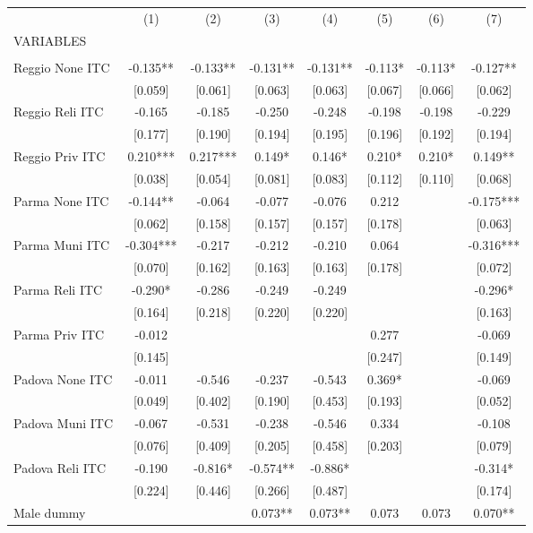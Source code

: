 \begin{tabular}{lccccccc} \hline
 & (1) & (2) & (3) & (4) & (5) & (6) & (7) \\
VARIABLES &  &  &  &  &  &  &  \\ \hline
 &  &  &  &  &  &  &  \\
Reggio None ITC & -0.135** & -0.133** & -0.131** & -0.131** & -0.113* & -0.113* & -0.127** \\
 & [0.059] & [0.061] & [0.063] & [0.063] & [0.067] & [0.066] & [0.062] \\
Reggio Reli ITC & -0.165 & -0.185 & -0.250 & -0.248 & -0.198 & -0.198 & -0.229 \\
 & [0.177] & [0.190] & [0.194] & [0.195] & [0.196] & [0.192] & [0.194] \\
Reggio Priv ITC & 0.210*** & 0.217*** & 0.149* & 0.146* & 0.210* & 0.210* & 0.149** \\
 & [0.038] & [0.054] & [0.081] & [0.083] & [0.112] & [0.110] & [0.068] \\
Parma None ITC & -0.144** & -0.064 & -0.077 & -0.076 & 0.212 &  & -0.175*** \\
 & [0.062] & [0.158] & [0.157] & [0.157] & [0.178] &  & [0.063] \\
Parma Muni ITC & -0.304*** & -0.217 & -0.212 & -0.210 & 0.064 &  & -0.316*** \\
 & [0.070] & [0.162] & [0.163] & [0.163] & [0.178] &  & [0.072] \\
Parma Reli ITC & -0.290* & -0.286 & -0.249 & -0.249 &  &  & -0.296* \\
 & [0.164] & [0.218] & [0.220] & [0.220] &  &  & [0.163] \\
Parma Priv ITC & -0.012 &  &  &  & 0.277 &  & -0.069 \\
 & [0.145] &  &  &  & [0.247] &  & [0.149] \\
Padova None ITC & -0.011 & -0.546 & -0.237 & -0.543 & 0.369* &  & -0.069 \\
 & [0.049] & [0.402] & [0.190] & [0.453] & [0.193] &  & [0.052] \\
Padova Muni ITC & -0.067 & -0.531 & -0.238 & -0.546 & 0.334 &  & -0.108 \\
 & [0.076] & [0.409] & [0.205] & [0.458] & [0.203] &  & [0.079] \\
Padova Reli ITC & -0.190 & -0.816* & -0.574** & -0.886* &  &  & -0.314* \\
 & [0.224] & [0.446] & [0.266] & [0.487] &  &  & [0.174] \\
Male dummy &  &  & 0.073** & 0.073** & 0.073 & 0.073 & 0.070** \\

\end{tabular}
